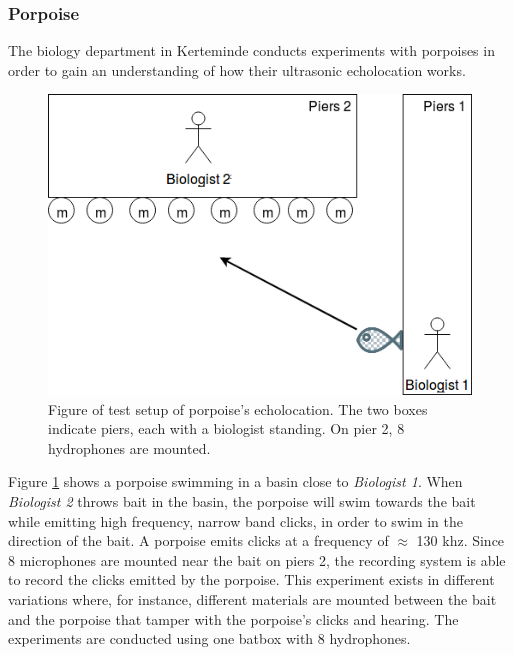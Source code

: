 \subsubsection{Porpoise} \label{sec:usecase:porpoise}
The biology department in Kerteminde conducts experiments with porpoises in order to gain an understanding of how their ultrasonic echolocation works.
\begin{figure}[!h]
    \centering
	\includegraphics[width=\textwidth]{figures/porpoise_experiment1}
	\caption{Figure of test setup of porpoise's echolocation. The two boxes indicate piers, each with a biologist standing. On pier 2, 8 hydrophones are mounted.}\label{usecase:porpoise_experiment1}
\end{figure}


Figure \ref{usecase:porpoise_experiment1} shows a porpoise swimming in a basin close to \textit{Biologist 1}.
When \textit{Biologist 2} throws bait in the basin, the porpoise will swim towards the bait while emitting high frequency, narrow band clicks, in order to swim in the direction of the bait. A porpoise emits clicks at a frequency of $\approx$ 130 khz.
Since 8 microphones are mounted near the bait on piers 2, the recording system is able to record the clicks emitted by the porpoise. This experiment exists in different variations where, for instance, different materials are mounted between the bait and the porpoise that tamper with the porpoise's clicks and hearing. The experiments are conducted using one batbox with 8 hydrophones.

